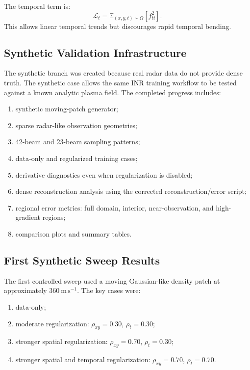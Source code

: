 \documentclass[11pt]{article}
\newcommand{\E}{\mathbb{E}}
\newcommand{\mps}{\mathrm{m\,s^{-1}}}
\begin{document}
The temporal term is:
\begin{equation}
  \mathcal{L}_{t}
  =
  \E_{(x,y,t)\sim\Omega}
  \left[
    f_{tt}^2
  \right].
\end{equation}
This allows linear temporal trends but discourages rapid temporal bending.

\subsection{Synthetic Validation Infrastructure}

The synthetic branch was created because real radar data do not provide dense truth. The synthetic
case allows the same INR training workflow to be tested against a known analytic plasma field.
The completed progress includes:
\begin{enumerate}[leftmargin=*]
  \item synthetic moving-patch generator;
  \item sparse radar-like observation geometries;
  \item 42-beam and 23-beam sampling patterns;
  \item data-only and regularized training cases;
  \item derivative diagnostics even when regularization is disabled;
  \item dense reconstruction analysis using the corrected reconstruction/error script;
  \item regional error metrics: full domain, interior, near-observation, and high-gradient regions;
  \item comparison plots and summary tables.
\end{enumerate}

\subsection{First Synthetic Sweep Results}

The first controlled sweep used a moving Gaussian-like density patch at approximately
$360~\mps$. The key cases were:
\begin{enumerate}[leftmargin=*]
  \item data-only;
  \item moderate regularization: $\rho_{xy}=0.30$, $\rho_t=0.30$;
  \item stronger spatial regularization: $\rho_{xy}=0.70$, $\rho_t=0.30$;
  \item stronger spatial and temporal regularization: $\rho_{xy}=0.70$, $\rho_t=0.70$.
\end{enumerate}
\end{document}
